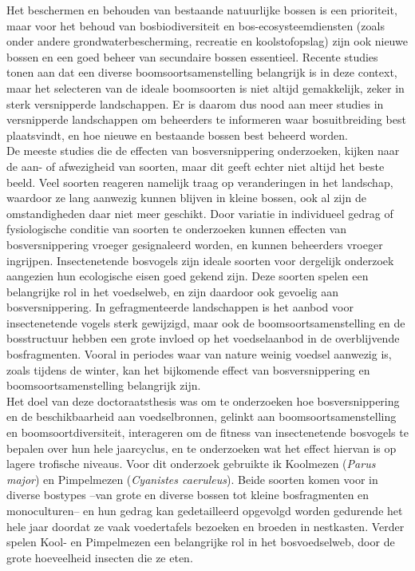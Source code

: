 \documentclass[10pt, twoside]{book} %
\begin{document}
Het beschermen en behouden van bestaande natuurlijke bossen is een prioriteit, maar voor het behoud van bosbiodiversiteit en bos-ecosysteemdiensten (zoals onder andere grondwaterbescherming, recreatie en koolstofopslag) zijn ook nieuwe bossen en een goed beheer van secundaire bossen essentieel. Recente studies tonen aan dat een diverse boomsoortsamenstelling belangrijk is in deze context, maar het selecteren van de ideale boomsoorten is niet altijd gemakkelijk, zeker in sterk versnipperde landschappen. Er is daarom dus nood aan meer studies in versnipperde landschappen om beheerders te informeren waar bosuitbreiding best plaatsvindt, en hoe nieuwe en bestaande bossen best beheerd worden.\\

De meeste studies die de effecten van bosversnippering onderzoeken, kijken naar de aan- of afwezigheid van soorten, maar dit geeft echter niet altijd het beste beeld. Veel soorten reageren namelijk traag op veranderingen in het landschap, waardoor ze lang aanwezig kunnen blijven in kleine bossen, ook al zijn de omstandigheden daar niet meer geschikt. Door variatie in individueel gedrag of fysiologische conditie van soorten te onderzoeken kunnen effecten van bosversnippering vroeger gesignaleerd worden, en kunnen beheerders vroeger ingrijpen. Insectenetende bosvogels zijn ideale soorten voor dergelijk onderzoek aangezien hun ecologische eisen goed gekend zijn. Deze soorten spelen een belangrijke rol in het voedselweb, en zijn daardoor ook gevoelig aan bosversnippering. In gefragmenteerde landschappen is het aanbod voor insectenetende vogels sterk gewijzigd, maar ook de boomsoortsamenstelling en de bosstructuur hebben een grote invloed op het voedselaanbod in de overblijvende bosfragmenten. Vooral in periodes waar van nature weinig voedsel aanwezig is, zoals tijdens de winter, kan het bijkomende effect van bosversnippering en boomsoortsamenstelling belangrijk zijn.\\

Het doel van deze doctoraatsthesis was om te onderzoeken hoe bosversnippering en de beschikbaarheid aan voedselbronnen, gelinkt aan boomsoortsamenstelling en boomsoortdiversiteit, interageren om de fitness van insectenetende bosvogels te bepalen over hun hele jaarcyclus, en te onderzoeken wat het effect hiervan is op lagere trofische niveaus. Voor dit onderzoek gebruikte ik Koolmezen (\textit{Parus major}) en Pimpelmezen (\textit{Cyanistes caeruleus}). Beide soorten komen voor in diverse bostypes --van grote en diverse bossen tot kleine bosfragmenten en monoculturen-- en hun gedrag kan gedetailleerd opgevolgd worden gedurende het hele jaar doordat ze vaak voedertafels bezoeken en broeden in nestkasten. Verder spelen Kool- en Pimpelmezen een belangrijke rol in het bosvoedselweb, door de grote hoeveelheid insecten die ze eten.\\
\end{document}
